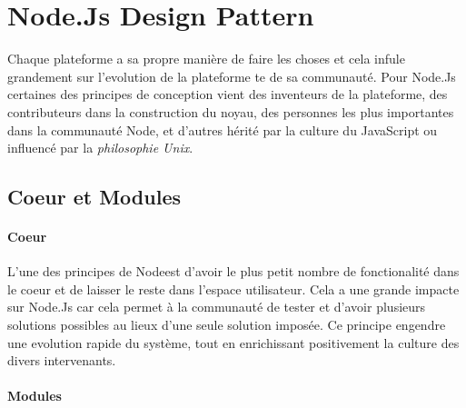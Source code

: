\section{Node.Js Design Pattern}
Chaque plateforme a sa propre manière de faire les choses et cela infule grandement sur l'evolution de la plateforme te de sa communauté.
Pour Node.Js certaines des principes de conception vient des inventeurs de la plateforme, des contributeurs dans la construction du noyau, des personnes les plus importantes dans la communauté Node, et d'autres hérité par la culture du JavaScript ou influencé par la \textit{philosophie Unix}.
\subsection{Coeur et Modules}
\paragraph{Coeur}
L'une des principes de Nodeest d'avoir le plus petit nombre de fonctionalité dans le coeur et de laisser le reste dans l'espace utilisateur. Cela a une grande impacte sur Node.Js car cela permet à la communauté de tester et d'avoir plusieurs solutions possibles au lieux d'une seule solution imposée. Ce principe engendre une evolution rapide du système, tout en enrichissant positivement la culture des divers intervenants.
\paragraph{Modules}
